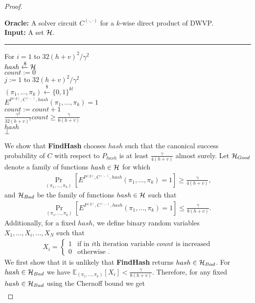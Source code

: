 \begin{proof}
\begin{codeblock}
  \textbf{Oracle:} A solver circuit $C^{(\cdot, \cdot)}$ for a $k$-wise direct product of DWVP. \\
  \textbf{Input:} A set $\mathcal{H}$.
  \medskip\hrule\medskip
  For $i = 1$ to $32(h+v)^2/\gamma^2$ \\
  \IndI $hash \xleftarrow{\$} \mathcal{H}$ \\
  \IndI $count := 0$ \\
  \IndI \For $j := 1$ to $32(h+v)^2/\gamma^2$ \\
  \IndII $(\pi_1, \dots, \pi_k) \xleftarrow{\$} \{0,1\}^{kl} $\\
  \IndII \If $E^{P^{(g)}, C^{(\cdot, \cdot)}, hash}(\pi_1, \dots, \pi_k) = 1$ \then \\
  \IndIII $count := count + 1$\\
  \IndI \If $\frac{\gamma^2}{32(h+v)^2} count \geq \frac{\gamma}{6(h+v)}$ \\
  \IndII \return $hash$\\
  \return $\bot$
\end{codeblock}
We show that \textbf{FindHash} chooses $hash$ such
that the canonical success probability of $C$
with respect to $P_{hash}$ is at least $\frac{\gamma}{4(h+v)}$ almost surely.
Let $\mathcal{H}_{Good}$ denote a family of functions $hash \in \mathcal{H}$ for which
\begin{align*}
\underset{(\pi_1, \dots, \pi_k)}{\Pr}[E^{P^{(g)}, C^{(\cdot, \cdot)}, hash}(\pi_1, \dots, \pi_k) = 1] \geq \frac{\gamma}{4(h+v)},
\end{align*}
and $\mathcal{H}_{Bad}$ be the family of functions $hash \in \mathcal{H}$ such that
\begin{align*}
\underset{(\pi_1, \dots, \pi_k)}{\Pr}[E^{P^{(g)}, C^{(\cdot, \cdot)}, hash}(\pi_1, \dots, \pi_k) = 1] \leq \frac{\gamma}{8(h+v)}.
\end{align*}
Additionally, for a fixed $hash$, we define binary random variables $X_1, \dots, X_i, \dots, X_N$ such that
\begin{align*}
  X_i =
  \begin{cases}
    1 & \text{if in $i$th iteration variable $count$ is increased}\\
    0 & \text{otherwise .}
  \end{cases}
\end{align*}
We first show that it is unlikely that \textbf{FindHash} returns $hash \in \mathcal{H}_{Bad}$.
For $hash \in \mathcal{H}_{Bad}$ we have $\mathbb{E}_{(\pi_1, \dots, \pi_k)}[X_i] < \frac{\gamma}{8(h+v)}$.
Therefore, for any fixed $hash \in \mathcal{H}_{Bad}$ using the Chernoff bound we get
\begin{align*}

\end{align*}
\end{proof}

